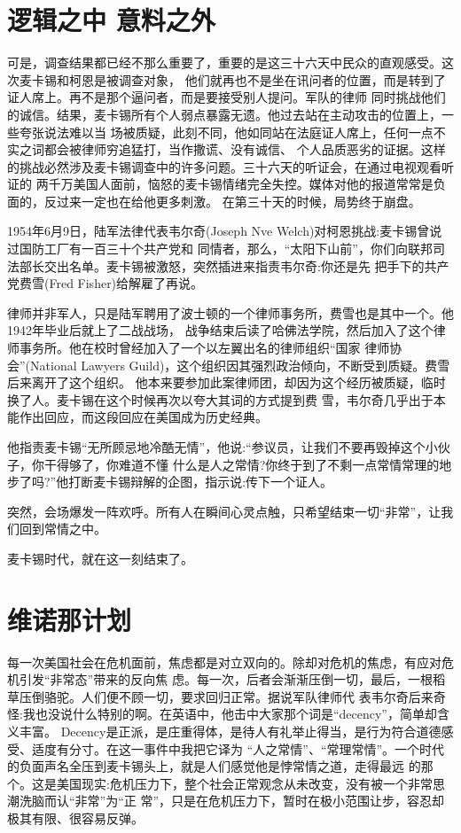 \documentclass[10pt]{article}
\begin{document}
{\pagebreak
\section{逻辑之中 意料之外}

可是，调查结果都已经不那么重要了，重要的是这三十六天中民众的直观感受。这次麦卡锡和柯恩是被调查对象，
他们就再也不是坐在讯问者的位置，而是转到了证人席上。再不是那个逼问者，而是要接受别人提问。军队的律师
同时挑战他们的诚信。结果，麦卡锡所有个人弱点暴露无遗。他过去站在主动攻击的位置上，一些夸张说法难以当
场被质疑，此刻不同，他如同站在法庭证人席上，任何一点不实之词都会被律师穷追猛打，当作撒谎、没有诚信、
个人品质恶劣的证据。这样的挑战必然涉及麦卡锡调查中的许多问题。三十六天的听证会，在通过电视观看听证的
两千万美国人面前，恼怒的麦卡锡情绪完全失控。媒体对他的报道常常是负面的，反过来一定也在给他更多刺激。
在第三十天的时候，局势终于崩盘。

1954年6月9日，陆军法律代表韦尔奇(Joseph Nve Welch)对柯恩挑战:麦卡锡曾说过国防工厂有一百三十个共产党和
同情者，那么，``太阳下山前''，你们向联邦司法部长交出名单。麦卡锡被激怒，突然插进来指责韦尔奇:你还是先
把手下的共产党费雪(Fred Fisher)给解雇了再说。

律师并非军人，只是陆军聘用了波士顿的一个律师事务所，费雪也是其中一个。他1942年毕业后就上了二战战场，
战争结束后读了哈佛法学院，然后加入了这个律师事务所。他在校时曾经加入了一个以左翼出名的律师组织``国家
律师协会''(National Lawyers Guild)，这个组织因其强烈政治倾向，不断受到质疑。费雪后来离开了这个组织。
他本来要参加此案律师团，却因为这个经历被质疑，临时换了人。麦卡锡在这个时候再次以夸大其词的方式提到费
雪，韦尔奇几乎出于本能作出回应，而这段回应在美国成为历史经典。

他指责麦卡锡``无所顾忌地冷酷无情''，他说:``参议员，让我们不要再毁掉这个小伙子，你干得够了，你难道不懂
什么是人之常情?你终于到了不剩一点常情常理的地步了吗?''他打断麦卡锡辩解的企图，指示说:传下一个证人。

突然，会场爆发一阵欢呼。所有人在瞬间心灵点触，只希望结束一切``非常''，让我们回到常情之中。

麦卡锡时代，就在这一刻结束了。

\pagebreak
\section{维诺那计划}

每一次美国社会在危机面前，焦虑都是对立双向的。除却对危机的焦虑，有应对危机引发``非常态''带来的反向焦
虑。每一次，后者会渐渐压倒一切，最后，一根稻草压倒骆驼。人们便不顾一切，要求回归正常。据说军队律师代
表韦尔奇后来奇怪:我也没说什么特别的啊。在英语中，他击中大家那个词是``decency''，简单却含义丰富。
Decency是正派，是庄重得体，是待人有礼举止得当，是行为符合道德感受、适度有分寸。在这一事件中我把它译为
``人之常情''、``常理常情''。一个时代的负面声名全压到麦卡锡头上，就是人们感觉他是悖常情之道，走得最远
的那个。这是美国现实:危机压力下，整个社会正常观念从未改变，没有被一个非常思潮洗脑而认``非常''为``正
常''，只是在危机压力下，暂时在极小范围让步，容忍却极其有限、很容易反弹。

}
\end{document}

